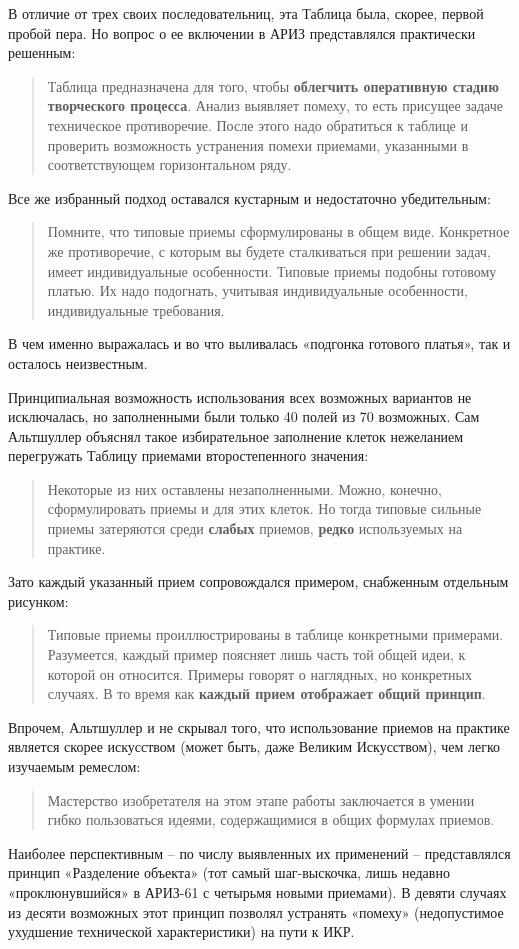 \documentclass[11pt,a4paper]{article}
\begin{document}
В отличие от трех своих последовательниц, эта Таблица была, скорее, первой
пробой пера. Но вопрос о ее включении в АРИЗ представлялся практически
решенным:
\begin{quote}
  Таблица предназначена для того, чтобы \textbf{облегчить оперативную стадию
    творческого процесса}. Анализ выявляет помеху, то есть присущее задаче
  техническое противоречие. После этого надо обратиться к таблице и проверить
  возможность устранения помехи приемами, указанными в соответствующем
  горизонтальном ряду. \cite{Altshuller1964}
\end{quote}
Все же избранный подход оставался кустарным и недостаточно убедительным:
\begin{quote}  
  Помните, что типовые приемы сформулированы в общем виде. Конкретное же
  противоречие, с которым вы будете сталкиваться при решении задач, имеет
  индивидуальные особенности. Типовые приемы подобны готовому платью. Их надо
  подогнать, учитывая индивидуальные особенности, индивидуальные требования.
\end{quote}
В чем именно выражалась и во что выливалась «подгонка готового платья», так и
осталось неизвестным.

Принципиальная возможность использования всех возможных вариантов не
исключалась, но заполненными были только 40 полей из 70 возможных. Сам
Альтшуллер объяснял такое избирательное заполнение клеток нежеланием
перегружать Таблицу приемами второстепенного значения:
\begin{quote}  
  Некоторые из них оставлены незаполненными. Можно, конечно, сформулировать
  приемы и для этих клеток. Но тогда типовые сильные приемы затеряются среди
  \textbf{слабых} приемов, \textbf{редко} используемых на практике.
\end{quote}
Зато каждый указанный прием сопровождался примером, снабженным отдельным
рисунком:
\begin{quote}  
  Типовые приемы проиллюстрированы в таблице конкретными примерами.
  Разумеется, каждый пример поясняет лишь часть той общей идеи, к которой он
  относится. Примеры говорят о наглядных, но конкретных случаях. В то время
  как \textbf{каждый прием отображает общий принцип}.
\end{quote}
Впрочем, Альтшуллер и не скрывал того, что использование приемов на практике
является скорее искусством (может быть, даже Великим Искусством), чем легко
изучаемым ремеслом:
\begin{quote}  
  Мастерство изобретателя на этом этапе работы заключается в умении гибко
  пользоваться идеями, содержащимися в общих формулах приемов.
\end{quote}
Наиболее перспективным -- по числу выявленных их применений -- представлялся
принцип «Разделение объекта» (тот самый шаг-выскочка, лишь недавно
«проклюнувшийся» в АРИЗ-61 с четырьмя новыми приемами). В девяти случаях из
десяти возможных этот принцип позволял устранять «помеху» (недопустимое
ухудшение технической характеристики) на пути к ИКР.
\end{document}
